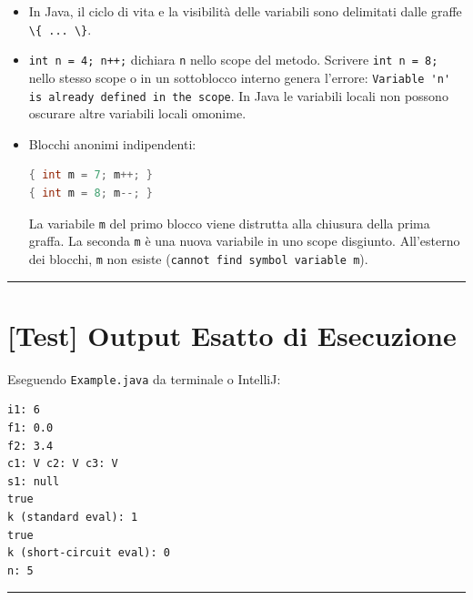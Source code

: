 \documentclass[11pt,a4paper,oneside]{report}
\newcommand{\passthrough}[1]{#1}
\begin{document}
\begin{enumerate}
  \begin{itemize}
  \item
    In Java, il ciclo di vita e la visibilità delle variabili sono
    delimitati dalle graffe \passthrough{\lstinline!\{ ... \}!}.
  \item
    \passthrough{\lstinline!int n = 4; n++;!} dichiara
    \passthrough{\lstinline!n!} nello scope del metodo. Scrivere
    \passthrough{\lstinline!int n = 8;!} nello stesso scope o in un
    sottoblocco interno genera l'errore:
    \passthrough{\lstinline!Variable 'n' is already defined in the scope!}.
    In Java le variabili locali non possono oscurare altre variabili
    locali omonime.
  \item
    Blocchi anonimi indipendenti:

\begin{lstlisting}[language=Java]
{ int m = 7; m++; }
{ int m = 8; m--; }
\end{lstlisting}

    La variabile \passthrough{\lstinline!m!} del primo blocco viene
    distrutta alla chiusura della prima graffa. La seconda
    \passthrough{\lstinline!m!} è una nuova variabile in uno scope
    disgiunto. All'esterno dei blocchi, \passthrough{\lstinline!m!} non
    esiste (\passthrough{\lstinline!cannot find symbol variable m!}).
  \end{itemize}
\end{enumerate}

\begin{center}\rule{0.5\linewidth}{0.5pt}\end{center}

\section{{[}Test{]} Output Esatto di
Esecuzione}\label{chap04_test-output-esatto-di-esecuzione}

Eseguendo \passthrough{\lstinline!Example.java!} da terminale o
IntelliJ:

\begin{lstlisting}
i1: 6
f1: 0.0
f2: 3.4
c1: V c2: V c3: V
s1: null
true
k (standard eval): 1
true
k (short-circuit eval): 0
n: 5
\end{lstlisting}

\begin{center}\rule{0.5\linewidth}{0.5pt}\end{center}
\end{document}
